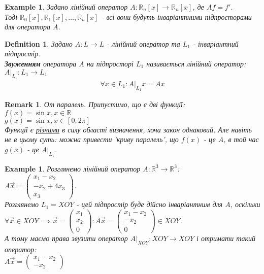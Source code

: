 \documentclass[a4paper, 10pt]{article}
\theoremstyle{theoremdd}
\theoremstyle{theoremdd}
\newtheorem{definition}[theorem]{Definition}
\theoremstyle{theoremdd}
\theoremstyle{theoremdd}
\newtheorem{example}[theorem]{Example}
\theoremstyle{theoremdd}
\theoremstyle{theoremdd}
\newtheorem{remark}[theorem]{Remark}
\theoremstyle{theoremdd}
\theoremstyle{theoremdd}
\begin{document}
\begin{example}
Задано лінійний оператор $A: \mathbb{R}_n[x] \to \mathbb{R}_n[x]$, де $Af = f'$.\\
Тоді $\mathbb{R}_0[x], \mathbb{R}_1[x],\dots,\mathbb{R}_n[x]$ - всі вони будуть інваріантними підпросторами для оператора $A$.
\end{example}

\begin{definition}
Задано $A: L \to L$ - лінійний оператор та $L_1$ - інваріантний підпростір.\\
\textbf{Звуженням} оператора $A$ на підпросторі $L_1$ називається лінійний оператор: $A |_{L_1}: L_1 \to L_1$
\begin{align*}
\forall x \in L_1: A |_{L_1}x = Ax
\end{align*}
\end{definition}

\begin{remark}
От паралель. Припустимо, що є дві функції:\\
$f(x) = \sin x, x \in \mathbb{R}$\\
$g(x) = \sin x, x \in [0,2\pi]$\\
Функції є \underline{різними} в силу області визначення, хоча закон однаковий. Але навіть не в цьому суть: можна привести 'криву паралель', що $f(x)$ - це $A$, в той час $g(x)$ - це $A |_{L_1}$.
\end{remark}

\iffalse
\begin{example}
Розглянемо лінійний оператор $A: \mathbb{R}^3 \to \mathbb{R}^3$:\\
$A \vec{x} = \begin{pmatrix}
x_1 - x_2 \\ -x_2 + 4x_3 \\ x_3
\end{pmatrix}$.\\
Розглянемо $L_1 = XOY$ - цей підпростір буде дійсно інваріантним для $A$, оскільки\\
$\forall \vec{x} \in XOY \implies \vec{x} = \begin{pmatrix}
x_1 \\ x_2 \\ 0
\end{pmatrix}: A \vec{x} = \begin{pmatrix}
x_1 - x_2 \\ -x_2 \\ 0
\end{pmatrix} \in XOY$.\\
А тому маємо права звузити оператор $A|_{XOY}: XOY \to XOY$ і отримати такий оператор:\\
$A \vec{x} = \begin{pmatrix}
x_1 - x_2 \\ -x_2
\end{pmatrix}$
\end{example}
\end{document}
